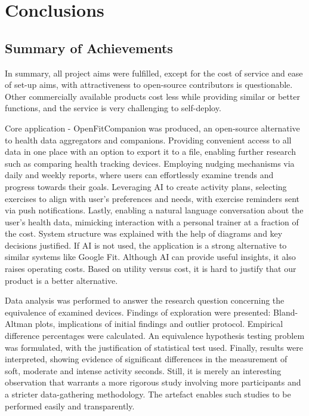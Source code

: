 \chapter{Conclusions}
\label{cha:evaluation}
\section{Summary of Achievements}
In summary, all project aims were fulfilled, except for the cost of service and ease of set-up aims, with attractiveness to open-source contributors is questionable. Other commercially available products cost less while providing similar or better functions, and the service is very challenging to self-deploy.

Core application - OpenFitCompanion was produced, an open-source alternative to health data aggregators and companions. Providing convenient access to all data in one place with an option to export it to a file, enabling further research such as comparing health tracking devices. Employing nudging mechanisms via daily and weekly reports, where users can effortlessly examine trends and progress towards their goals. Leveraging AI to create activity plans, selecting exercises to align with user's preferences and needs, with exercise reminders sent via push notifications. Lastly, enabling a natural language conversation about the user's health data, mimicking interaction with a personal trainer at a fraction of the cost. System structure was explained with the help of diagrams and key decisions justified. If AI is not used, the application is a strong alternative to similar systems like Google Fit. Although AI can provide useful insights, it also raises operating costs. Based on utility versus cost, it is hard to justify that our product is a better alternative.

Data analysis was performed to answer the research question concerning the equivalence of examined devices. Findings of exploration were presented: Bland-Altman plots, implications of initial findings and outlier protocol. Empirical difference percentages were calculated. An equivalence hypothesis testing problem was formulated, with the justification of statistical test used. Finally, results were interpreted, showing evidence of significant differences in the measurement of soft, moderate and intense activity seconds. Still, it is merely an interesting observation that warrants a more rigorous study involving more participants and a stricter data-gathering methodology. The artefact enables such studies to be performed easily and transparently.
